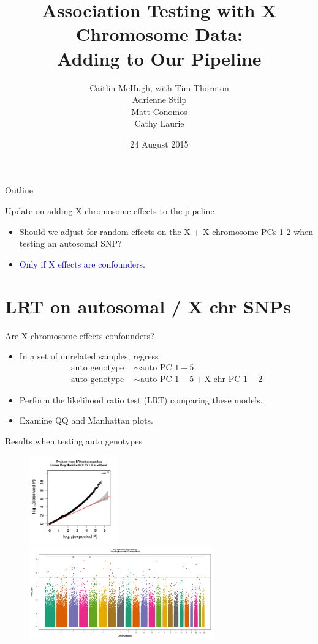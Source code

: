 \documentclass{beamer}
\title[Association Testing with X Chromosome Data] %
{Association Testing with X Chromosome Data:\\
Adding to Our Pipeline}
\author[Caitlin McHugh, with Tim Thornton\\Adrienne Stilp\\Matt Conomos\\Cathy Laurie] %
{Caitlin McHugh, with Tim Thornton\\Adrienne Stilp\\Matt Conomos\\Cathy Laurie}
\institute[University of Washington] %
{
  Department of Biostatistics\\
  University of Washington
}
\date[Short Occasion] %
{24 August 2015}
\begin{document}
\begin{frame}
  \titlepage
\end{frame}

\begin{frame}{Outline}
 \tableofcontents
\end{frame}


\begin{frame}{Update on adding X chromosome effects to the pipeline}
\begin{itemize}
\item Should we adjust for random effects on the X + X chromosome PCs 1-2 when testing an autosomal SNP?
\item \textcolor{blue}{Only if X effects are confounders.}
\end{itemize}
\end{frame}

\section[]{LRT on autosomal / X chr SNPs}
\begin{frame}{Are X chromosome effects confounders?}
\begin{itemize}
\item In a set of unrelated samples, regress 
\begin{align*}
\mbox{auto genotype }&\sim \mbox{auto PC }1-5\\
\mbox{auto genotype }&\sim \mbox{auto PC }1-5 + \mbox{X chr PC }1-2
\end{align*}
\item Perform the likelihood ratio test (LRT) comparing these models.
\item Examine QQ and Manhattan plots.
\end{itemize}
\end{frame}

\begin{frame}{Results when testing auto genotypes}
\begin{figure}
\includegraphics[height=3.8cm]{../olga_update_27july2015/qqPlot_autoSNPs.png}
\includegraphics[width=8cm]{../olga_update_27july2015/manhPlot_autoSNPs.png}
\end{figure}
\end{frame}
\end{document}
